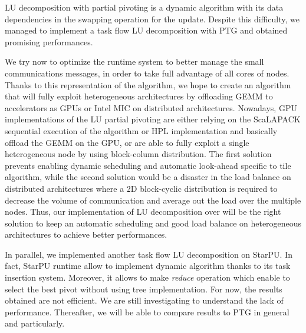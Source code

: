 LU decomposition with partial pivoting is a dynamic algorithm with its data dependencies in the swapping operation for the update. Despite this difficulty, we managed to implement a task flow LU decomposition with PTG and obtained promising performances.

We try now to optimize the \dague runtime system to better manage the small communications messages, in order to take full advantage of all cores of nodes. 
Thanks to this representation of the algorithm, we hope to create an algorithm that will fully exploit heterogeneous architectures by offloading GEMM to accelerators as GPUs or Intel MIC on distributed architectures. Nowadays, GPU implementations of the LU partial pivoting are either relying on the ScaLAPACK sequential execution of the algorithm or HPL implementation and basically offload the GEMM on the GPU, or are able to fully exploit a single heterogeneous node by using block-column distribution. The first solution prevents enabling dynamic scheduling and automatic look-ahead specific to tile algorithm, while the second solution would be a disaster in the load balance on distributed architectures where a 2D block-cyclic distribution is required to decrease the volume of communication and average out the load over the multiple nodes. Thus, our implementation of LU decomposition over \dague will be the right solution to keep an automatic scheduling and good load balance on heterogeneous architectures to achieve better performances.

In parallel, we implemented another task flow LU decomposition on StarPU. In fact, StarPU runtime allow to implement dynamic algorithm  thanks to its task insertion system. Moreover, it allows to make \emph{reduce} operation which enable to select the best pivot without using tree implementation. For now, the results obtained are not efficient. We are still investigating to understand the lack of performance. Thereafter, we will be able to compare results to PTG in general and \dague particularly.